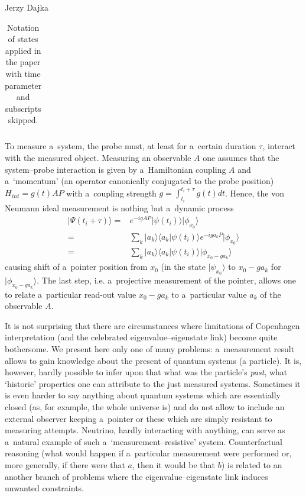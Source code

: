 \begin{artengenv}{Jerzy Dajka}
\begin{table}[ht]
\begin{tabular}{|l||l|}
\end{tabular}
\caption{\label{tabx} Notation of states applied in the paper with time parameter and subscripts skipped.}
\end{table}
  To measure a~system, the probe must, at least for a~certain duration $\tau$, interact with the measured object. Measuring an observable $A$ one assumes that the system--probe interaction is given by a~Hamiltonian coupling $A$ and a~`momentum' (an operator canonically conjugated to the  probe position) 
  \mbox{$H_{int}=g(t)AP$} with a~coupling strength $g=\int_{t_i}^{t_i+\tau} g(t)dt$. 
  Hence, the von Neumann ideal measurement is nothing but a~dynamic process 
  \begin{equation}
     \begin{split}\label{ideal}
            |\Psi(t_i+\tau)\rangle
            = &e^{-igAP}|\psi(t_i)\rangle|\phi_{x_0}\rangle\\
            = &\sum_k|a_k\rangle\langle a_k|\psi(t_i)\rangle e^{-iga_k P}|\phi_{x_0}\rangle\\
            = &\sum_k|a_k\rangle\langle a_k|\psi(t_i)\rangle|\phi_{x_0-ga_k}\rangle
     \end{split}
  \end{equation}
causing shift of a~pointer position from $x_0$ (in the state $|\psi_{x_0}\rangle$ to $x_0-ga_k$ for $|\phi_{x_0-ga_k}\rangle$. The last step, i.e. a~projective measurement of the pointer, allows one to relate a~particular  read-out value $x_0-ga_k$ to a~particular value $a_k$ of the observable $A$. 

It is not surprising that there are circumstances where  limitations of Copenhagen interpretation (and the celebrated eigenvalue--eigenstate link) become quite bothersome. We present here only one of many problems: 
a~measurement result allows to gain knowledge about the present of quantum systems (a particle). It is, however, hardly possible to infer upon that what was the particle's {\it past}, what `historic' properties one can attribute to the just measured systems. Sometimes  it is even harder to say anything about  quantum systems which are essentially closed (as, for example, the whole universe is) and do not allow to include an external observer keeping a~pointer or these which are simply resistant to measuring attempts. Neutrino, hardly interacting with anything, can serve as a~natural example of such a~`measurement--resistive' system. Counterfactual reasoning  (what would happen if a~particular measurement were performed  or, more generally,  if there were that $a$, then it would be that $b$) is related to an another branch of problems where the eigenvalue--eigenstate link induces unwanted constraints. 


\end{artengenv}
